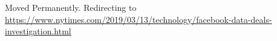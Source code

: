 Moved Permanently. Redirecting to
\url{https://www.nytimes.com/2019/03/13/technology/facebook-data-deals-investigation.html}
